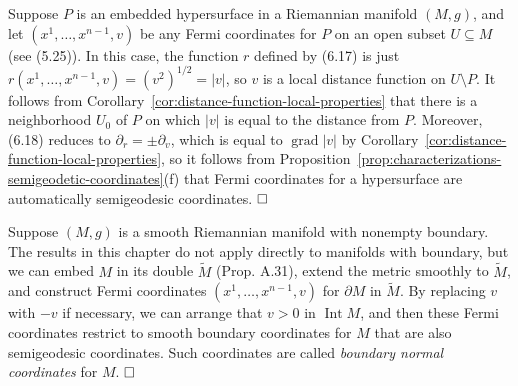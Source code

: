 \begin{example}
\label{ex:fermi-coordinates-hypersurface}

Suppose $P$ is an embedded hypersurface in a Riemannian manifold $(M, g)$, and let $(x^1, \ldots, x^{n-1}, v)$ be any Fermi coordinates for $P$ on an open subset $U \subseteq M$ (see (5.25)). In this case, the function $r$ defined by (6.17) is just $r(x^1, \ldots, x^{n-1}, v) = (v^2)^{1/2} = |v|$, so $v$ is a local distance function on $U \setminus P$. It follows from Corollary~\ref{cor:distance-function-local-properties} that there is a neighborhood $U_0$ of $P$ on which $|v|$ is equal to the distance from $P$. Moreover, (6.18) reduces to $\partial_r = \pm\partial_v$, which is equal to $\operatorname{grad}|v|$ by Corollary~\ref{cor:distance-function-local-properties}, so it follows from Proposition~\ref{prop:characterizations-semigeodetic-coordinates}(f) that Fermi coordinates for a hypersurface are automatically semigeodesic coordinates. $\hfill\square$
\end{example}

\begin{example}
\label{ex:boundary-normal-coordinates}

Suppose $(M, g)$ is a smooth Riemannian manifold with nonempty boundary. The results in this chapter do not apply directly to manifolds with boundary, but we can embed $M$ in its double $\tilde{M}$ (Prop. A.31), extend the metric smoothly to $\tilde{M}$, and construct Fermi coordinates $(x^1, \ldots, x^{n-1}, v)$ for $\partial M$ in $\tilde{M}$. By replacing $v$ with $-v$ if necessary, we can arrange that $v > 0$ in $\operatorname{Int} M$, and then these Fermi coordinates restrict to smooth boundary coordinates for $M$ that are also semigeodesic coordinates. Such coordinates are called \emph{boundary normal coordinates} for $M$. $\hfill\square$
\end{example}


